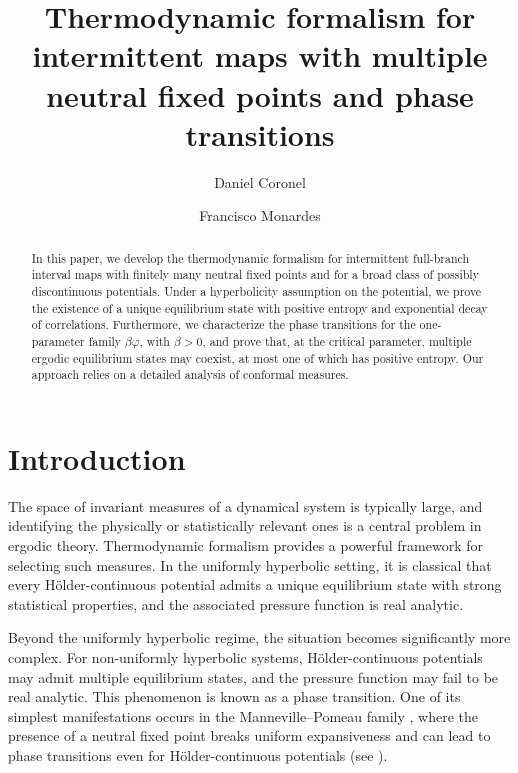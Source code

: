 \documentclass[12pt]{amsart}
\numberwithin{equation}{section} %
\numberwithin{figure}{section} %
\theoremstyle{plain}
\theoremstyle{definition}
\theoremstyle{remark}
\theoremstyle{citing}
\renewcommand{\=}{\coloneqq}
\begin{document}

\title[Thermodynamic formalism for intermittent maps with multiple fixed points and phase transitions]{Thermodynamic formalism for intermittent maps with multiple neutral fixed points and phase transitions}
\author{Daniel Coronel}
 \address{Facultad de Matem\'aticas, Pontificia Universidad Cat\'olica de Chile, Campus San Joaqu\'in, Avenida Vicu\~{n}a Mackenna 4860, 
Santiago, Chile.} 
\author{Francisco Monardes}
\address{Department of Mathematics, The Pennsylvania State University, University Park, PA 16802, USA.}

\begin{abstract}
In this paper, we develop the thermodynamic formalism for intermittent full-branch interval maps with finitely many neutral fixed points and for a broad class of possibly discontinuous potentials. Under a hyperbolicity assumption on the potential, we prove the existence of a unique equilibrium state with positive entropy and exponential decay of correlations. Furthermore, we characterize the phase transitions for the one-parameter family $\beta\varphi$, with $\beta>0$, and prove that, at the critical parameter, multiple ergodic equilibrium states may coexist, at most one of which has positive entropy. Our approach relies on a detailed analysis of conformal measures.
\end{abstract}


\maketitle

%
%

\section{Introduction}
\label{s:intro}
The space of invariant measures of a dynamical system is typically large, and identifying the physically or statistically relevant ones is a central problem in ergodic theory. Thermodynamic formalism provides a powerful framework for selecting such measures. In the uniformly hyperbolic setting, it is classical that every Hölder-continuous potential admits a unique equilibrium state with strong statistical properties, and the associated pressure function is real analytic.

Beyond the uniformly hyperbolic regime, the situation becomes significantly more complex. For non-uniformly hyperbolic systems, Hölder-continuous potentials may admit multiple equilibrium states, and the pressure function may fail to be real analytic. This phenomenon is known as a phase transition. One of its simplest manifestations occurs in the Manneville--Pomeau family \cite{MannevillePomeau}, where the presence of a neutral fixed point breaks uniform expansiveness and can lead to phase transitions even for Hölder-continuous potentials (see \cite{BruinTerhesiuTodd,ClimenhagaThompson,coronelRivera1,coronelRivera2,PrellbergSlawny,Sarig1}).
\end{document}
